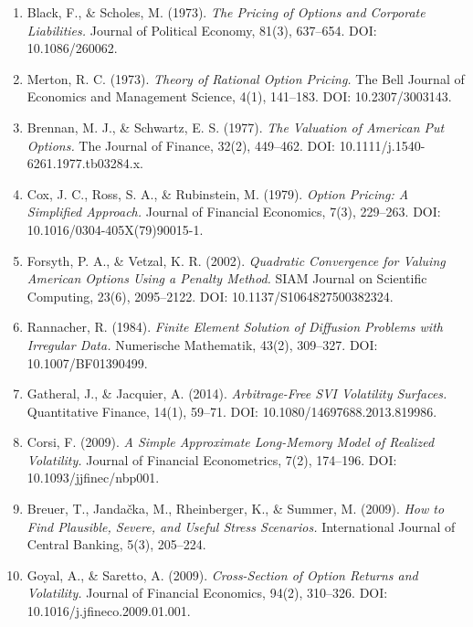\documentclass[11pt,a4paper]{article}
\begin{document}
\begin{enumerate}
    \item Black, F., \& Scholes, M. (1973). \textit{The Pricing of Options and Corporate Liabilities.} Journal of Political Economy, 81(3), 637–654. DOI: 10.1086/260062.
    \item Merton, R. C. (1973). \textit{Theory of Rational Option Pricing.} The Bell Journal of Economics and Management Science, 4(1), 141–183. DOI: 10.2307/3003143.
    \item Brennan, M. J., \& Schwartz, E. S. (1977). \textit{The Valuation of American Put Options.} The Journal of Finance, 32(2), 449–462. DOI: 10.1111/j.1540-6261.1977.tb03284.x.
    \item Cox, J. C., Ross, S. A., \& Rubinstein, M. (1979). \textit{Option Pricing: A Simplified Approach.} Journal of Financial Economics, 7(3), 229–263. DOI: 10.1016/0304-405X(79)90015-1.
    \item Forsyth, P. A., \& Vetzal, K. R. (2002). \textit{Quadratic Convergence for Valuing American Options Using a Penalty Method.} SIAM Journal on Scientific Computing, 23(6), 2095–2122. DOI: 10.1137/S1064827500382324.
    \item Rannacher, R. (1984). \textit{Finite Element Solution of Diffusion Problems with Irregular Data.} Numerische Mathematik, 43(2), 309–327. DOI: 10.1007/BF01390499.
    \item Gatheral, J., \& Jacquier, A. (2014). \textit{Arbitrage-Free SVI Volatility Surfaces.} Quantitative Finance, 14(1), 59–71. DOI: 10.1080/14697688.2013.819986.
    \item Corsi, F. (2009). \textit{A Simple Approximate Long-Memory Model of Realized Volatility.} Journal of Financial Econometrics, 7(2), 174–196. DOI: 10.1093/jjfinec/nbp001.
    \item Breuer, T., Jandačka, M., Rheinberger, K., \& Summer, M. (2009). \textit{How to Find Plausible, Severe, and Useful Stress Scenarios.} International Journal of Central Banking, 5(3), 205–224.
    \item Goyal, A., \& Saretto, A. (2009). \textit{Cross-Section of Option Returns and Volatility.} Journal of Financial Economics, 94(2), 310–326. DOI: 10.1016/j.jfineco.2009.01.001.
\end{enumerate}
\end{document}
